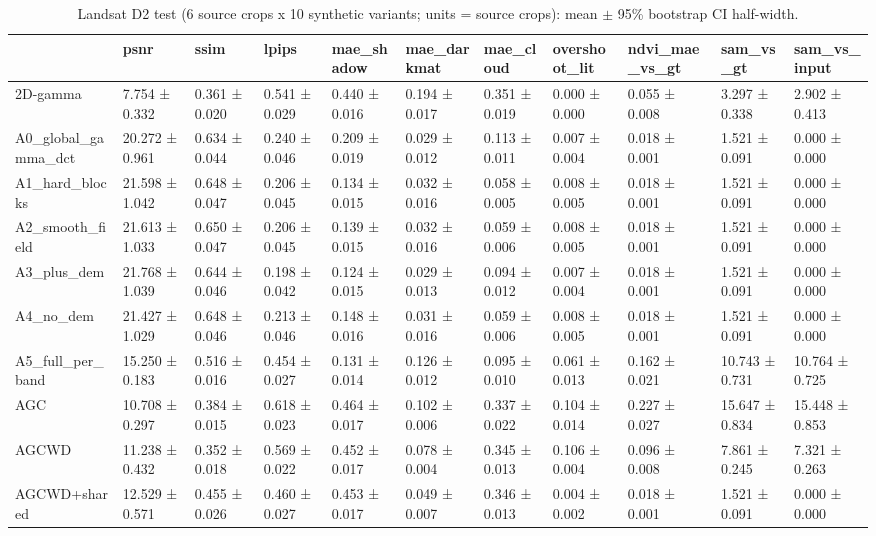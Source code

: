 \begin{table}[t]
\caption{Landsat D2 test (6 source crops x 10 synthetic variants; units = source crops): mean $\pm$ 95\% bootstrap CI half-width.}
\label{tab:d2_summary}
\begin{tabular}{lllllllllll}
\toprule
 & psnr & ssim & lpips & mae\_shadow & mae\_darkmat & mae\_cloud & overshoot\_lit & ndvi\_mae\_vs\_gt & sam\_vs\_gt & sam\_vs\_input \\
\midrule
2D-gamma & 7.754 ± 0.332 & 0.361 ± 0.020 & 0.541 ± 0.029 & 0.440 ± 0.016 & 0.194 ± 0.017 & 0.351 ± 0.019 & 0.000 ± 0.000 & 0.055 ± 0.008 & 3.297 ± 0.338 & 2.902 ± 0.413 \\
A0\_global\_gamma\_dct & 20.272 ± 0.961 & 0.634 ± 0.044 & 0.240 ± 0.046 & 0.209 ± 0.019 & 0.029 ± 0.012 & 0.113 ± 0.011 & 0.007 ± 0.004 & 0.018 ± 0.001 & 1.521 ± 0.091 & 0.000 ± 0.000 \\
A1\_hard\_blocks & 21.598 ± 1.042 & 0.648 ± 0.047 & 0.206 ± 0.045 & 0.134 ± 0.015 & 0.032 ± 0.016 & 0.058 ± 0.005 & 0.008 ± 0.005 & 0.018 ± 0.001 & 1.521 ± 0.091 & 0.000 ± 0.000 \\
A2\_smooth\_field & 21.613 ± 1.033 & 0.650 ± 0.047 & 0.206 ± 0.045 & 0.139 ± 0.015 & 0.032 ± 0.016 & 0.059 ± 0.006 & 0.008 ± 0.005 & 0.018 ± 0.001 & 1.521 ± 0.091 & 0.000 ± 0.000 \\
A3\_plus\_dem & 21.768 ± 1.039 & 0.644 ± 0.046 & 0.198 ± 0.042 & 0.124 ± 0.015 & 0.029 ± 0.013 & 0.094 ± 0.012 & 0.007 ± 0.004 & 0.018 ± 0.001 & 1.521 ± 0.091 & 0.000 ± 0.000 \\
A4\_no\_dem & 21.427 ± 1.029 & 0.648 ± 0.046 & 0.213 ± 0.046 & 0.148 ± 0.016 & 0.031 ± 0.016 & 0.059 ± 0.006 & 0.008 ± 0.005 & 0.018 ± 0.001 & 1.521 ± 0.091 & 0.000 ± 0.000 \\
A5\_full\_per\_band & 15.250 ± 0.183 & 0.516 ± 0.016 & 0.454 ± 0.027 & 0.131 ± 0.014 & 0.126 ± 0.012 & 0.095 ± 0.010 & 0.061 ± 0.013 & 0.162 ± 0.021 & 10.743 ± 0.731 & 10.764 ± 0.725 \\
AGC & 10.708 ± 0.297 & 0.384 ± 0.015 & 0.618 ± 0.023 & 0.464 ± 0.017 & 0.102 ± 0.006 & 0.337 ± 0.022 & 0.104 ± 0.014 & 0.227 ± 0.027 & 15.647 ± 0.834 & 15.448 ± 0.853 \\
AGCWD & 11.238 ± 0.432 & 0.352 ± 0.018 & 0.569 ± 0.022 & 0.452 ± 0.017 & 0.078 ± 0.004 & 0.345 ± 0.013 & 0.106 ± 0.004 & 0.096 ± 0.008 & 7.861 ± 0.245 & 7.321 ± 0.263 \\
AGCWD+shared & 12.529 ± 0.571 & 0.455 ± 0.026 & 0.460 ± 0.027 & 0.453 ± 0.017 & 0.049 ± 0.007 & 0.346 ± 0.013 & 0.004 ± 0.002 & 0.018 ± 0.001 & 1.521 ± 0.091 & 0.000 ± 0.000 \\

\end{tabular}
\end{table}
